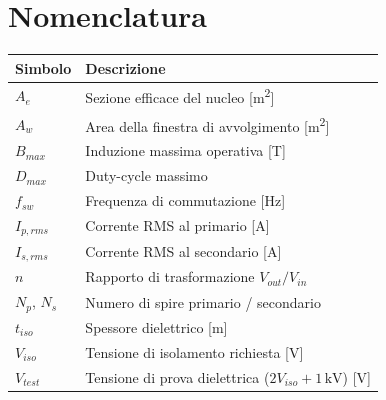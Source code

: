 \documentclass[a4paper,11pt]{article}
\begin{document}
\appendix
\section{Nomenclatura}

\begin{tabularx}{0.85\linewidth}{C{1.8cm} L{9cm}}
\toprule
\textbf{Simbolo} & \textbf{Descrizione} \\
\midrule
$A_e$       & Sezione efficace del nucleo [\si{\metre\squared}] \\
$A_w$       & Area della finestra di avvolgimento [\si{\metre\squared}] \\
$B_{max}$   & Induzione massima operativa [\si{\tesla}] \\
$D_{max}$   & Duty-cycle massimo \\
$f_{sw}$    & Frequenza di commutazione [\si{\hertz}] \\
$I_{p,rms}$ & Corrente RMS al primario [\si{\ampere}] \\
$I_{s,rms}$ & Corrente RMS al secondario [\si{\ampere}] \\
$n$         & Rapporto di trasformazione $V_{out}/V_{in}$ \\
$N_p$, $N_s$& Numero di spire primario / secondario \\
$t_{iso}$   & Spessore dielettrico [\si{\metre}] \\
$V_{iso}$   & Tensione di isolamento richiesta [\si{\volt}] \\
$V_{test}$  & Tensione di prova dielettrica ($2V_{iso}+1\,\mathrm{kV}$) [\si{\volt}] \\
\bottomrule
\end{tabularx}
\end{document}
